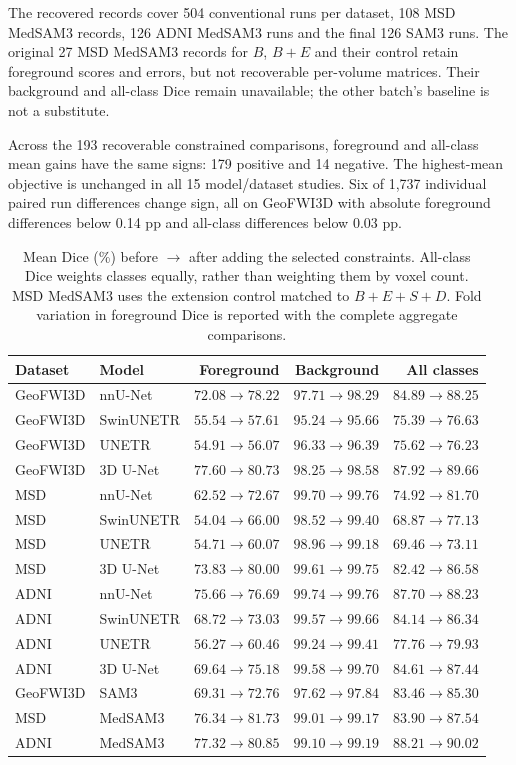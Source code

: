\documentclass[12pt,a4paper]{article}
\begin{document}
The recovered records cover 504 conventional runs per dataset, 108 MSD
MedSAM3 records, 126 ADNI MedSAM3 runs and the final 126 SAM3 runs.
The original 27 MSD MedSAM3 records for $B$, $B+E$ and their control
retain foreground scores and errors, but not recoverable per-volume
matrices. Their background and all-class Dice remain unavailable;
the other batch's baseline is not a substitute.

Across the 193 recoverable constrained comparisons, foreground and
all-class mean gains have the same signs: 179 positive and 14 negative.
The highest-mean objective is unchanged in all 15 model/dataset studies.
Six of 1,737 individual paired run differences change sign, all on
GeoFWI3D with absolute foreground differences below 0.14 pp and
all-class differences below 0.03 pp.

\begin{table}[htbp]
\centering\footnotesize{}
\setlength{\tabcolsep}{4pt}\renewcommand{\arraystretch}{1.15}
\begin{tabular}{@{}llrrr@{}}
\hline
Dataset & Model & Foreground & Background & All classes \\
\hline
GeoFWI3D & nnU-Net & $72.08\to78.22$ & $97.71\to98.29$ & $84.89\to88.25$ \\
GeoFWI3D & SwinUNETR & $55.54\to57.61$ & $95.24\to95.66$ & $75.39\to76.63$ \\
GeoFWI3D & UNETR & $54.91\to56.07$ & $96.33\to96.39$ & $75.62\to76.23$ \\
GeoFWI3D & 3D U-Net & $77.60\to80.73$ & $98.25\to98.58$ & $87.92\to89.66$ \\
MSD & nnU-Net & $62.52\to72.67$ & $99.70\to99.76$ & $74.92\to81.70$ \\
MSD & SwinUNETR & $54.04\to66.00$ & $98.52\to99.40$ & $68.87\to77.13$ \\
MSD & UNETR & $54.71\to60.07$ & $98.96\to99.18$ & $69.46\to73.11$ \\
MSD & 3D U-Net & $73.83\to80.00$ & $99.61\to99.75$ & $82.42\to86.58$ \\
ADNI & nnU-Net & $75.66\to76.69$ & $99.74\to99.76$ & $87.70\to88.23$ \\
ADNI & SwinUNETR & $68.72\to73.03$ & $99.57\to99.66$ & $84.14\to86.34$ \\
ADNI & UNETR & $56.27\to60.46$ & $99.24\to99.41$ & $77.76\to79.93$ \\
ADNI & 3D U-Net & $69.64\to75.18$ & $99.58\to99.70$ & $84.61\to87.44$ \\
GeoFWI3D & SAM3 & $69.31\to72.76$ & $97.62\to97.84$ & $83.46\to85.30$ \\
MSD & MedSAM3 & $76.34\to81.73$ & $99.01\to99.17$ & $83.90\to87.54$ \\
ADNI & MedSAM3 & $77.32\to80.85$ & $99.10\to99.19$ & $88.21\to90.02$ \\
\hline
\end{tabular}
\caption{Mean Dice (\%) before $\to$ after adding the selected constraints. All-class Dice weights classes equally, rather than weighting them by voxel count. MSD MedSAM3 uses the extension control matched to $B+E+S+D$. Fold variation in foreground Dice is reported with the complete aggregate comparisons.}
\label{tab:complementary-dice-summary}
\end{table}
\end{document}

